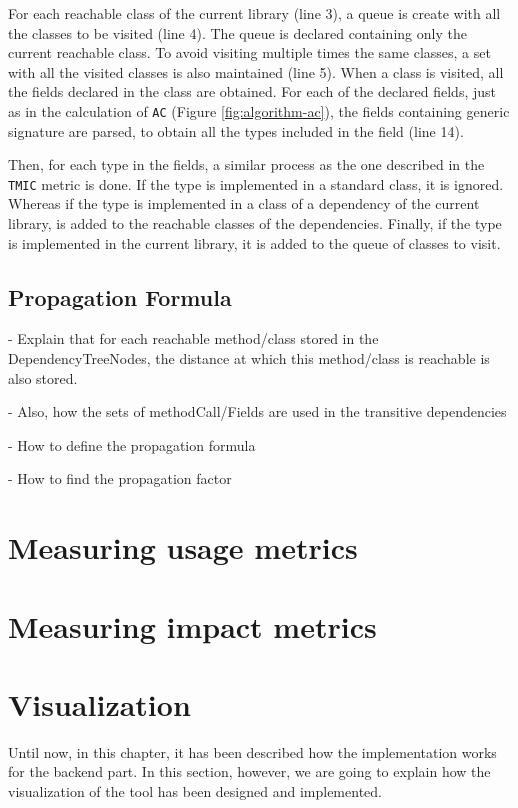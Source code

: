 For each reachable class of the current library (line 3), a queue is create with all the classes to be visited (line 4). The queue is declared containing only the current reachable class. To avoid visiting multiple times the same classes, a set with all the visited classes is also maintained (line 5). When a class is visited, all the fields declared in the class are obtained. For each of the declared fields, just as in the calculation of \texttt{AC} (Figure \ref{fig:algorithm-ac}), the fields containing generic signature are parsed, to obtain all the types included in the field (line 14).

Then, for each type in the fields, a similar process as the one described in the \texttt{TMIC} metric is done. If the type is implemented in a standard class, it is ignored. Whereas if the type is implemented in a class of a dependency of the current library, is added to the reachable classes of the dependencies. Finally, if the type is implemented in the current library, it is added to the queue of classes to visit.


\subsection{Propagation Formula}
- Explain that for each reachable method/class stored in the DependencyTreeNodes, the distance at which this method/class is reachable is also stored.

- Also, how the sets of methodCall/Fields are used in the transitive dependencies

- How to define the propagation formula

- How to find the propagation factor

\section{Measuring usage metrics}

\section{Measuring impact metrics}

\section{Visualization}
Until now, in this chapter, it has been described how the implementation works for the backend part. In this section, however, we are going to explain how the visualization of the tool has been designed and implemented.

